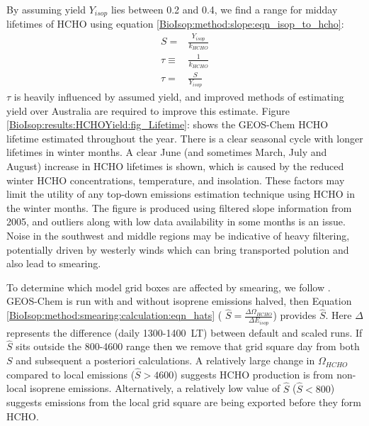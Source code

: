     By assuming yield $Y_{isop}$ lies between 0.2 and 0.4, we find a range for midday lifetimes of HCHO using equation \ref{BioIsop:method:slope:eqn_isop_to_hcho}:
    \begin{eqnarray*}
      S = & \frac{Y_{isop}}{k_{HCHO}} \\
      \tau \equiv & \frac{1}{k_{HCHO}} \\
      \tau = & \frac{S}{Y_{isop}}
    \end{eqnarray*}
    $\tau$ is heavily influenced by assumed yield, and improved methods of estimating yield over Australia are required to improve this estimate.
    Figure \ref{BioIsop:results:HCHOYield:fig_Lifetime}: shows the GEOS-Chem HCHO lifetime estimated throughout the year.
    There is a clear seasonal cycle with longer lifetimes in winter months.
    A clear June (and sometimes March, July and August) increase in HCHO lifetimes is shown, which is caused by the reduced winter HCHO concentrations, temperature, and insolation.
    These factors may limit the utility of any top-down emissions estimation technique using HCHO in the winter months.
    The figure is produced using filtered slope information from 2005, and outliers along with low data availability in some months is an issue.
    Noise in the southwest and middle regions may be indicative of heavy filtering, potentially driven by westerly winds which can bring transported polution and also lead to smearing.
    
      
      To determine which model grid boxes are affected by smearing, we follow \textcite{Marais2012}.
      GEOS-Chem is run with and without isoprene emissions halved, then Equation \ref{BioIsop:method:smearing:calculation:eqn_hats} ( $\hat{S} = \frac{\Delta \Omega_{HCHO}}{\Delta E_{isop}} $) provides $\hat{S}$.
      Here $\Delta$ represents the difference (daily 1300-1400~LT) between default and scaled runs.
      If $\hat{S}$ sits outside the 800-4600 range then we remove that grid square day from both $S$ and subsequent a posteriori calculations.
      A relatively large change in $\Omega_{HCHO}$ compared to local emissions ($\hat{S}>4600$) suggests HCHO production is from non-local isoprene emissions.
      Alternatively, a relatively low value of $\hat{S}$ ($\hat{S}<800$) suggests emissions from the local grid square are being exported before they form HCHO.
      
